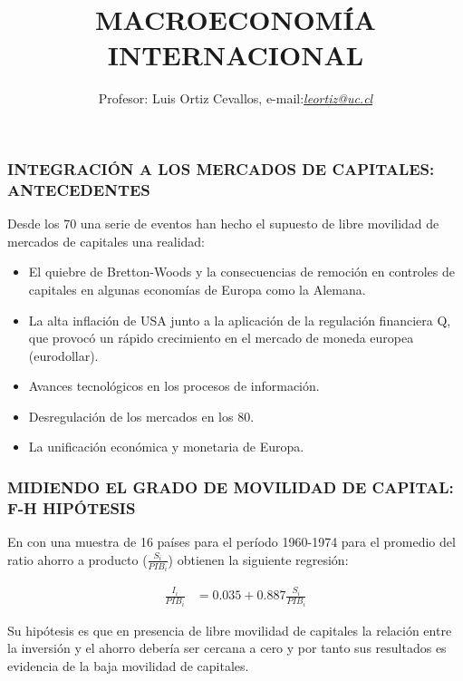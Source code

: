 \documentclass[10pt, xcolor=table, x11names]{beamer}
\author[Luis Ortiz Cevallos e-mail: \href{leortiz@uc.cl}{\textit{leortiz@uc.cl}}]{Profesor: Luis Ortiz Cevallos, e-mail:\href{leortiz@uc.cl}{\textit{leortiz@uc.cl}} }
\title[MACRO INTERNACIONAL]{\vspace*{1.0em} MACROECONOMÍA INTERNACIONAL}
\date[\href{https://ortiz-cevallos.github.io/luisortiz.github.io/ }{\textit{https://ortiz-cevallos.github.io/luisortiz.github.io/}}]{}
\begin{document}
\begin{frame}
\titlepage
\end{frame}


\begin{frame}[label=1]
	\frametitle{{\normalsize INTEGRACIÓN A LOS MERCADOS DE CAPITALES: ANTECEDENTES } {}}
	Desde los 70 una serie de eventos han hecho el supuesto de libre movilidad de mercados de capitales una realidad:
	
	\begin{itemize}
		\item El quiebre de Bretton-Woods y la consecuencias de remoción en controles de capitales en algunas economías de Europa como la Alemana.
		\item La alta inflación de USA junto a la aplicación de la regulación financiera Q, que provocó un rápido crecimiento en el mercado de moneda europea (eurodollar).
		\item Avances tecnológicos en los procesos de información.
		\item Desregulación de los mercados en los 80.
		\item La unificación económica y monetaria de Europa.
	\end{itemize}
\end{frame}

\begin{frame}[label=2]
	\frametitle{{\normalsize MIDIENDO EL GRADO DE MOVILIDAD DE CAPITAL: F-H HIPÓTESIS } {}}
En \cite{Feldstein79} con una muestra de 16 países para el período 1960-1974 para el promedio del ratio ahorro a producto ($\frac{S_{i}}{PIB_{i}}$)  obtienen la siguiente regresión: 

\begin{align}
\frac{I_{i}}{PIB_{i}}&=0.035+0.887\frac{S_{i}}{PIB_{i}} \nonumber
\end{align}

Su hipótesis es que en presencia de libre movilidad de capitales la relación entre la inversión y el ahorro debería ser cercana a cero y por tanto sus resultados es evidencia de la baja movilidad de capitales.

\end{frame}
\end{document}
